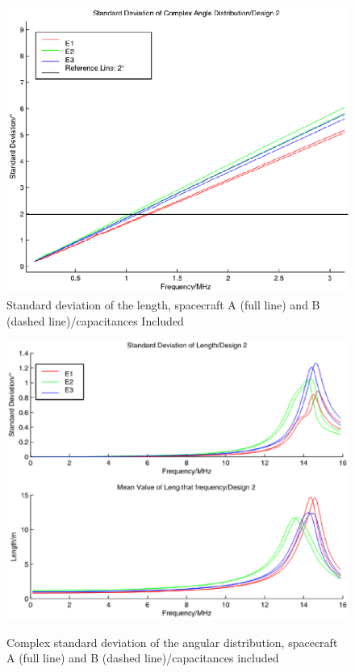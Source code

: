\documentclass[a4paper,10pt]{thesis}
\begin{document}
\begin{figure}
\begin{center}
\includegraphics[width=12cm]{VirtualSigma1D2_caps.eps}\\
\caption{Standard deviation of the length, spacecraft A (full line) and B (dashed line)/capacitances Included} \label{fig_VirtualSigma1_D2_caps}
\includegraphics[width=12cm]{VirtualSigma2D2_caps.eps} \\
\caption{Complex standard deviation of the angular distribution, spacecraft A (full line) and B (dashed line)/capacitances included} \label{fig_VirtualSigma2_D2_caps}
\end{center}
\end{figure}
\end{document}
